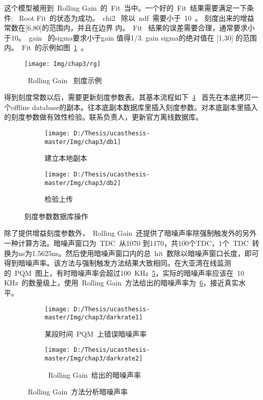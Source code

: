   这个模型被用到~Rolling Gain~的~Fit~当中。一个好的~Fit~结果需要满足一下条件:
~Root Fit~的状态为成功。~chi2 ~除以~ndf~需要小于~10~。 刻度出来的增益常数在[6,80]的范围内，并且在边界
内。~Fit ~结果的误差需要合理，通常要求小于10。~gain~ 的sigma要求小于gain 值得1/3. gain sigma的绝对值在
[1,30] 的范围内。~Fit~的示例如图~\ref{fig:rg}~。
\begin{figure}[!htbp]
  \centering
   \texttt{[image: Img/chap3/rg]}
    \caption{~Rolling Gain~ 刻度示例}
  \label{fig:rg}
\end{figure}
得到刻度常数以后，需要更新刻度参数表。其基本流程如下~\ref{fig:db}~
首先在本底拷贝一个offline database的副本。往本底副本数据库里插入刻度参数。对本底副本里插入的刻度参数做有效性检验。联系负责人，更新官方离线数据库。
\begin{figure}[!htbp]
  \centering
  \begin{subfigure}[b]{\MySubFactor\textwidth}
    \texttt{[image: D:/Thesis/ucasthesis-master/Img/chap3/db1]}
    \caption{建立本地副本}
    \label{fig:db_1}
  \end{subfigure}%
  \quad\quad\quad\quad%
  \begin{subfigure}[b]{\MySubFactor\textwidth}
    \texttt{[image: D:/Thesis/ucasthesis-master/Img/chap3/db2]}
    \caption{检验上传}
    \label{fig:db_2}
  \end{subfigure}
  \caption{刻度参数数据库操作}
  \label{fig:db}
\end{figure}

除了提供增益刻度参数外，~Rolling Gain~还提供了暗噪声率除强制触发外的另外一种计算方法。暗噪声窗口为~TDC~从1070 到1170，共100个TDC，1个~TDC~转换为ns为1.5625ns。然后使用暗噪声窗口内的总~hit~数除以暗噪声窗口长度，即可得到暗噪声率。该方法与强制触发方法结果大致相同。在大亚湾在线监测的~PQM~图上，有时暗噪声率会超过100~KHz~\ref{fig:darkrate_1}，实际的暗噪声率应该在~10 KHz~的数量级上，使用~Rolling Gain~方法给出的暗噪声率为~\ref{fig:darkrate_2}，接近真实水平。
\begin{figure}[!htbp]
  \centering
  \begin{subfigure}[b]{\MySubFactor\textwidth}
    \texttt{[image: D:/Thesis/ucasthesis-master/Img/chap3/darkrate1]}
    \caption{某段时间~PQM~上错误暗噪声率}
    \label{fig:darkrate_1}
  \end{subfigure}%
  \quad\quad\quad\quad%
  \begin{subfigure}[b]{\MySubFactor\textwidth}
    \texttt{[image: D:/Thesis/ucasthesis-master/Img/chap3/darkrate2]}
    \caption{~Rolling Gain~给出的暗噪声率 }
    \label{fig:darkrate_2}
  \end{subfigure}
  \caption{~Rolling Gain~方法分析暗噪声率}
  \label{fig:darkrate}
\end{figure}
